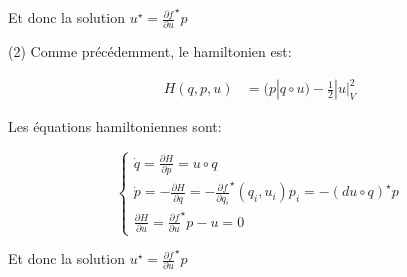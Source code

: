\documentclass[11pt]{article}
\begin{document}
    Et donc la solution $u^\star = \frac{\partial f}{\partial u}^\star p$

    (2) Comme précédemment, le hamiltonien est:

    \vspace{-4em}
    \begin{align*} 
      H(q, p, u) &= \big (p| q \circ u \big ) - \frac{1}{2} |u|_V^2
    \end{align*}
    \vspace{-4em}

    Les équations hamiltoniennes sont:

    \vspace{-2em}
    $$
    \begin{cases} 
    \dot{q} = \frac{\partial H}{\partial p} = u \circ q\\
    \dot{p} = -\frac{\partial H}{\partial q} = - \frac{\partial f}{\partial q_i}^\star (q_i, u_i) p_i = -(du \circ q)^\star p\\
    \frac{\partial H}{\partial u} = \frac{\partial f}{\partial u}^\star p - u = 0
    \end{cases}
    $$
    \vspace{-2em}

    Et donc la solution $u^\star = \frac{\partial f}{\partial u}^\star p$

    
\end{document}

